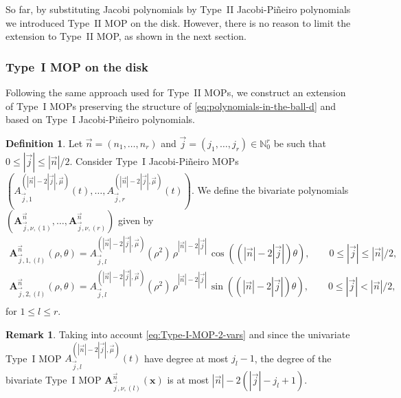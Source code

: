 \documentclass[a4paper]{article}
\theoremstyle{plain}
\theoremstyle{definition}
\newtheorem{definition}[theorem]{Definition}
\newtheorem{remark}[theorem]{Remark}
\newcommand{\NN}{\mathbb{N}}
\begin{document}
    So far, by substituting Jacobi polynomials by Type~II Jacobi-Pi\~neiro polynomials we introduced Type~II MOP on the disk. However, there is no reason to limit the extension to Type~II MOP, as shown in the next section.
        

    \subsubsection{Type~I MOP on the disk}\label{subsubsec:type-i-disk}

    Following the same approach used for Type~II MOPs, we construct an extension of Type~I MOPs preserving the structure of \eqref{eq:polynomials-in-the-ball-d} and based on Type~I Jacobi-Pi\~neiro polynomials.
    
    \begin{definition}\label{def:type-i-2-vars}
        Let $\vec n = (n_1,\dots,n_r)$ and $ \vec j = (j_1,\dots,j_r)\in\NN_0^r$ be such that $0\leq |\vec j| \leq |\vec n|/2$. Consider Type~I Jacobi-Pi\~neiro MOPs $\left(A^{(|\vec n|-2|\vec j|, \vec \mu)}_{\vec j,1}(t),\dots,A^{(|\vec n|-2|\vec j|, \vec \mu)}_{\vec j,r}(t)\right)$. We define the bivariate polynomials $\left(\mathbf A_{\vec j,\nu,(1)}^{\vec n}, \dots, \mathbf A_{\vec j,\nu,(r)}^{\vec n}\right)$ given by 
        \begin{equation}
            \label{eq:Type-I-MOP-2-vars}
            \begin{aligned}
                \mathbf A_{\vec j,1,(l)}^{\vec n}(\rho,\theta)= A^{(|\vec n|-2|\vec j|, \vec \mu)}_{\vec j,l}(\rho^2)\, \rho^{|\vec n|-2|\vec j|}\, \cos((|\vec n|-2|\vec j|)\theta), \qquad 0\leq |\vec j| \leq |\vec n|/2,\\
                \mathbf A_{\vec j,2,(l)}^{\vec n}(\rho,\theta)= A^{(|\vec n|-2|\vec j|, \vec \mu)}_{\vec j,l}(\rho^2)\, \rho^{|\vec n|-2|\vec j|}\, \sin((|\vec n|-2|\vec j|)\theta), \qquad 0\leq |\vec j| < |\vec n|/2,\\
            \end{aligned}
        \end{equation}
        for $1\leq l\leq r$.
    \end{definition}
    
    \begin{remark}\label{remark:degree-type-I}
    Taking into account \eqref{eq:Type-I-MOP-2-vars} and since the univariate Type~I MOP $A^{(|\vec n|-2|\vec j|, \vec \mu)}_{\vec j,l}(t)$ have degree at most $j_l-1$, the degree of the bivariate Type~I MOP $\mathbf A_{\vec j,\nu,(l)}^{\vec n}(\mathbf x)$ is at most $|\vec n|-2(|\vec j|-j_l+1)$.
    \end{remark}
\end{document}
